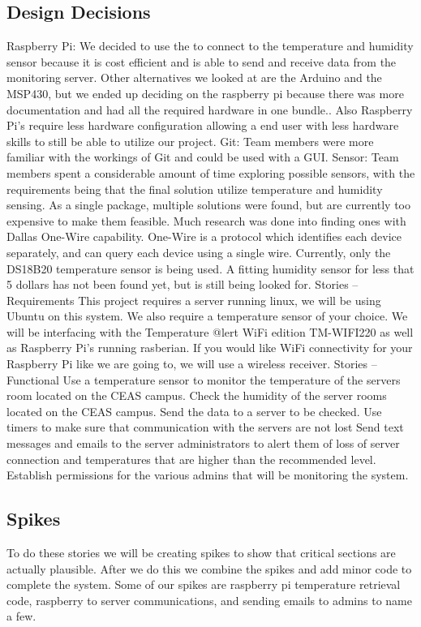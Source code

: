 \documentclass{report}
\begin{document}
\subsection*{Design Decisions}
Raspberry Pi: We decided to use the to connect to the temperature and humidity sensor because it is cost efficient and is able to send and receive data from the monitoring server. Other alternatives we looked at are the Arduino and the MSP430, but we ended up deciding on the raspberry pi because there was more documentation and had all the required hardware in one bundle.. Also Raspberry Pi’s require less hardware configuration allowing a end user with less hardware skills to still be able to utilize our project.
Git: Team members were more familiar with the workings of Git and could be used with a GUI.
Sensor: Team members spent a considerable amount of time exploring possible sensors, with the requirements being that the final solution utilize temperature and humidity sensing. As a single package, multiple solutions were found, but are currently too expensive to make them feasible. Much research was done into finding ones with Dallas One-Wire capability. One-Wire is a protocol which identifies each device separately, and can query each device using a single wire. Currently, only the DS18B20 temperature sensor is being used. A fitting humidity sensor for less that 5 dollars has not been found yet, but is still being looked for.
Stories -- Requirements
	This project requires a server running linux, we will be using Ubuntu on this system. We also require a temperature sensor of your choice. We will be interfacing with the Temperature @lert WiFi edition TM-WIFI220 as well as Raspberry Pi’s running rasberian. If you would like WiFi connectivity for your Raspberry Pi like we are going to, we will use a wireless receiver.
Stories -- Functional
Use a temperature sensor to monitor the temperature of the servers room located on the CEAS campus.
Check the humidity of the server rooms located on the CEAS campus.
Send the data to a server to be checked.
Use timers to make sure that communication with the servers are not lost
Send text messages and emails to the server administrators to alert them of loss of server connection and temperatures that are higher than the recommended level.
Establish permissions for the various admins that will be monitoring the system.

\newpage
\subsection*{Spikes}
	To do these stories we will be creating spikes to show that critical sections are actually plausible. After we do this we combine the spikes and add minor code to complete the system. Some of our spikes are raspberry pi temperature retrieval code, raspberry to server communications, and sending emails to admins to name a few. 
\newpage
\end{document}
